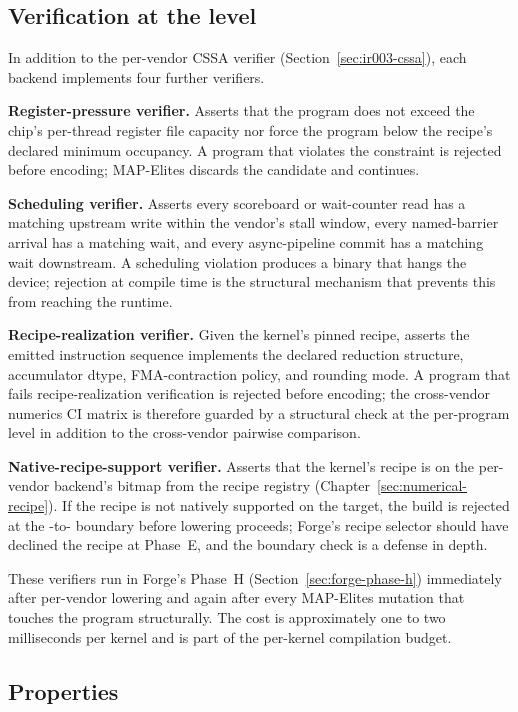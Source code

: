 \subsection{Verification at the  level}
\label{sec:ir003-verification}

In addition to the per-vendor CSSA verifier (Section~\ref{sec:ir003-cssa}), each backend implements four further verifiers.

\textbf{Register-pressure verifier.}
Asserts that the program does not exceed the chip's per-thread register file capacity nor force the program below the recipe's declared minimum occupancy.
A program that violates the constraint is rejected before encoding; MAP-Elites discards the candidate and continues.

\textbf{Scheduling verifier.}
Asserts every scoreboard or wait-counter read has a matching upstream write within the vendor's stall window, every named-barrier arrival has a matching wait, and every async-pipeline commit has a matching wait downstream.
A scheduling violation produces a binary that hangs the device; rejection at compile time is the structural mechanism that prevents this from reaching the runtime.

\textbf{Recipe-realization verifier.}
Given the kernel's pinned recipe, asserts the emitted instruction sequence implements the declared reduction structure, accumulator dtype, FMA-contraction policy, and rounding mode.
A program that fails recipe-realization verification is rejected before encoding; the cross-vendor numerics CI matrix is therefore guarded by a structural check at the per-program level in addition to the cross-vendor pairwise comparison.

\textbf{Native-recipe-support verifier.}
Asserts that the kernel's recipe is on the per-vendor backend's  bitmap from the recipe registry (Chapter~\ref{sec:numerical-recipe}).
If the recipe is not natively supported on the target, the build is rejected at the -to- boundary before lowering proceeds; Forge's recipe selector should have declined the recipe at Phase~E, and the boundary check is a defense in depth.

These verifiers run in Forge's Phase~H (Section~\ref{sec:forge-phase-h}) immediately after per-vendor lowering and again after every MAP-Elites mutation that touches the program structurally.
The cost is approximately one to two milliseconds per kernel and is part of the per-kernel compilation budget.

\subsection{Properties}
\label{sec:ir003-properties}


